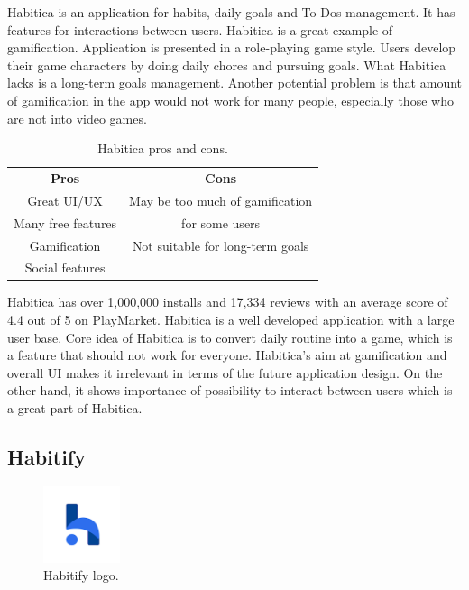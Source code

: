 Habitica is an application for habits, daily goals and To-Dos management.
It has features for interactions between users.
Habitica is a great example of gamification.
Application is presented in a role-playing game style.
Users develop their game characters by doing daily chores and pursuing goals.
What Habitica lacks is a long-term goals management.
Another potential problem is that amount of gamification in the app would not work for many people,
especially those who are not into video games.

\begin{table}[h!]
    \centering
    \begin{ctucolortab}
        \begin{tabular}{cc}
            \bfseries Pros & \bfseries Cons\\\Midrule
            Great UI/UX & May be too much of gamification \\
            Many free features & for some users \\
            Gamification & Not suitable for long-term goals \\
            Social features & \\
        \end{tabular}
    \end{ctucolortab}
    \caption{Habitica pros and cons.}\label{tab:habitica-pros-cons}
\end{table}

Habitica has over 1,000,000 installs and 17,334 reviews with an average score of 4.4 out of 5 on PlayMarket.
Habitica is a well developed application with a large user base.
Core idea of Habitica is to convert daily routine into a game, which is a feature that should not work for everyone.
Habitica's aim at gamification and overall UI makes it irrelevant in terms of the future application design.
On the other hand, it shows importance of possibility to interact between users which is a great part of Habitica.


\subsection{Habitify}\label{subsec:habitify}

\begin{figure}[h!]
    \includegraphics[width=0.20\textwidth]{images/habitify-logo.png}
    \caption{Habitify logo.\cite{habitify-logo}}
    \label{fig:habitify-logo}
\end{figure}

